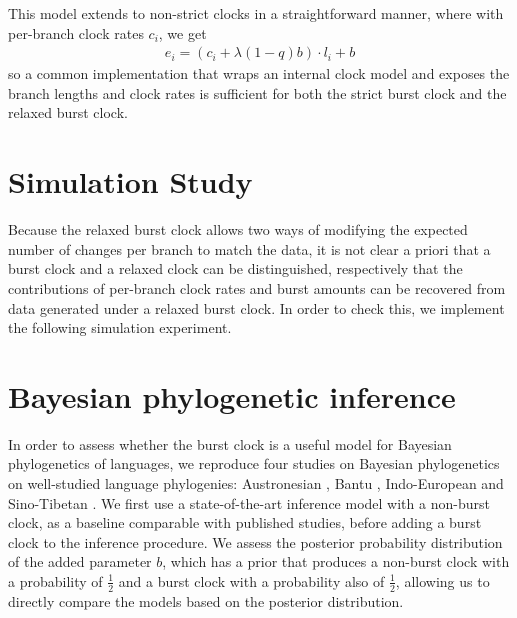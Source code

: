 \documentclass[a4paper,12pt]{scrartcl}
\begin{document}
This model extends to non-strict clocks in a straightforward manner, where with per-branch clock rates $c_i$, we get
\begin{align}
  e_i = (c_i + \lambda (1-q) b) \cdot l_i + b
  \label{eq:relaxed}
\end{align}
so a common implementation that wraps an internal clock model and exposes the branch lengths and clock rates is sufficient for
both the strict burst clock and the relaxed burst clock.

\section{Simulation Study}
Because the relaxed burst clock allows two ways of modifying the expected number
of changes per branch to match the data, it is not clear a priori that a burst
clock and a relaxed clock can be distinguished, respectively that the
contributions of per-branch clock rates and burst amounts can be recovered from
data generated under a relaxed burst clock.
In order to check this, we implement the following simulation experiment.

\section{Bayesian phylogenetic inference}

In order to assess whether the burst clock is a useful model for Bayesian
phylogenetics of languages, we reproduce four studies on Bayesian phylogenetics
on well-studied language phylogenies:
Austronesian
\parencite{gray2009language,greenhill2017evolutionary,greenhill2018population},
Bantu
\parencite{grollemund2015bantu,greenhill2018population,currie2013cultural},
Indo-European
\parencite{bouckaert2012mapping,chang2015ancestryconstrained,gray2003language,holm2017steppe,rama2018three,willems2016using}
and
Sino-Tibetan \parencite{sagart2019dated,zhang2019phylogenetic}.
We first
use a state-of-the-art inference model with a non-burst clock, as a baseline
comparable with published studies, before adding a burst clock to the inference
procedure. We assess the posterior probability distribution of the added
parameter $b$, which has a prior that produces a non-burst clock with a
probability of $\frac{1}{2}$ and a burst clock with a probability also of
$\frac{1}{2}$, allowing us to directly compare the models based on the posterior
distribution.
\end{document}
